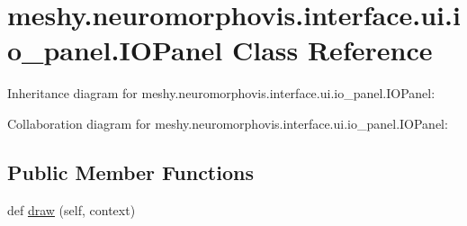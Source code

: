\hypertarget{classmeshy_1_1neuromorphovis_1_1interface_1_1ui_1_1io__panel_1_1IOPanel}{}\section{meshy.\+neuromorphovis.\+interface.\+ui.\+io\+\_\+panel.\+I\+O\+Panel Class Reference}
\label{classmeshy_1_1neuromorphovis_1_1interface_1_1ui_1_1io__panel_1_1IOPanel}


 




Inheritance diagram for meshy.\+neuromorphovis.\+interface.\+ui.\+io\+\_\+panel.\+I\+O\+Panel\+:


Collaboration diagram for meshy.\+neuromorphovis.\+interface.\+ui.\+io\+\_\+panel.\+I\+O\+Panel\+:
\subsection*{Public Member Functions}
\begin{DoxyCompactItemize}
\item 
def \hyperlink{classmeshy_1_1neuromorphovis_1_1interface_1_1ui_1_1io__panel_1_1IOPanel_aea90465244d08cc1a6e82a2ba6d771dc}{draw} (self, context)
\end{DoxyCompactItemize}

